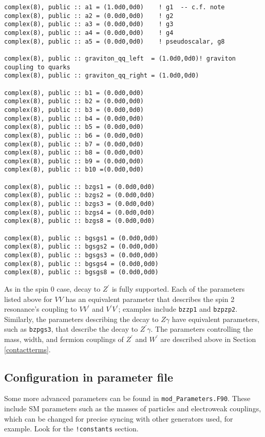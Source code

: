 \documentclass[aps,superscriptaddress,nofootinbib]{revtex4}
\begin{document}
\begin{verbatim}
complex(8), public :: a1 = (1.0d0,0d0)    ! g1  -- c.f. note
complex(8), public :: a2 = (0.0d0,0d0)    ! g2
complex(8), public :: a3 = (0.0d0,0d0)    ! g3
complex(8), public :: a4 = (0.0d0,0d0)    ! g4
complex(8), public :: a5 = (0.0d0,0d0)    ! pseudoscalar, g8

complex(8), public :: graviton_qq_left  = (1.0d0,0d0)! graviton coupling to quarks
complex(8), public :: graviton_qq_right = (1.0d0,0d0)

complex(8), public :: b1 = (0.0d0,0d0)
complex(8), public :: b2 = (0.0d0,0d0)
complex(8), public :: b3 = (0.0d0,0d0)
complex(8), public :: b4 = (0.0d0,0d0)
complex(8), public :: b5 = (0.0d0,0d0)
complex(8), public :: b6 = (0.0d0,0d0)
complex(8), public :: b7 = (0.0d0,0d0)
complex(8), public :: b8 = (0.0d0,0d0)
complex(8), public :: b9 = (0.0d0,0d0)
complex(8), public :: b10 =(0.0d0,0d0)

complex(8), public :: bzgs1 = (0.0d0,0d0)
complex(8), public :: bzgs2 = (0.0d0,0d0)
complex(8), public :: bzgs3 = (0.0d0,0d0)
complex(8), public :: bzgs4 = (0.0d0,0d0)
complex(8), public :: bzgs8 = (0.0d0,0d0)

complex(8), public :: bgsgs1 = (0.0d0,0d0)
complex(8), public :: bgsgs2 = (0.0d0,0d0)
complex(8), public :: bgsgs3 = (0.0d0,0d0)
complex(8), public :: bgsgs4 = (0.0d0,0d0)
complex(8), public :: bgsgs8 = (0.0d0,0d0)
\end{verbatim}

As in the spin 0 case, decay to $Z^\prime$ is fully supported.  Each of the parameters listed above for $VV$ has an equivalent parameter that describes the spin 2 resonance's coupling to $VV^\prime$ and $V^\prime V^\prime$; examples include \verb|bzzp1| and \verb|bzpzp2|.  Similarly, the parameters describing the decay to $Z\gamma$ have equivalent parameters, such as \verb|bzpgs3|, that describe the decay to $Z^\prime\gamma$.  The parameters controlling the mass, width, and fermion couplings of $Z^\prime$ and $W^\prime$ are described above in Section \ref{contactterms}.



\subsection{Configuration in parameter file}
Some more advanced parameters can be found in \verb|mod_Parameters.F90|.  These include SM parameters such as the masses of particles and electroweak couplings, which can be changed for precise syncing with other generators used, for example.  Look for the \verb|!constants| section.
\end{document}
